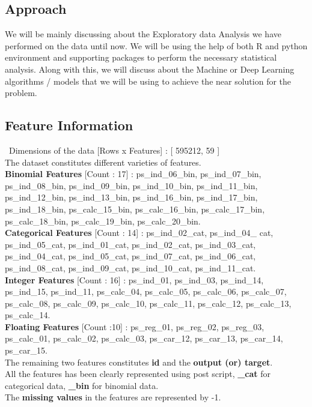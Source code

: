 \subsection{Approach}
We will be mainly discussing about the Exploratory data Analysis we have  performed on the data until now. We will be using the help of both R and python environment and supporting packages to perform the necessary statistical analysis. Along with this, we will discuss  about  the  Machine  or  Deep  Learning  algorithms  / models that we will be using to achieve the near solution for the problem.

\subsection{Feature Information}
\ Dimensions of the data [Rows x Features] : [ 595212, 59 ]
\\ \newline The dataset constitutes different varieties of features.
\\ \newline \textbf{Binomial Features} [Count : 17] :  ps\_ind\_06\_bin,  ps\_ind\_07\_bin, ps\_ind\_08\_bin, ps\_ind\_09\_bin, ps\_ind\_10\_bin, ps\_ind\_11\_bin, ps\_ind\_12\_bin, ps\_ind\_13\_bin, ps\_ind\_16\_bin, ps\_ind\_17\_bin, ps\_ind\_18\_bin, ps\_calc\_15\_bin, ps\_calc\_16\_bin, ps\_calc\_17\_bin, ps\_calc\_18\_bin, ps\_calc\_19\_bin, ps\_calc\_20\_bin.
\
\\ \newline \textbf{Categorical Features} [Count : 14] : ps\_ind\_02\_cat,  ps\_ind\_04\_ cat, ps\_ind\_05\_cat, ps\_ind\_01\_cat, ps\_ind\_02\_cat,  ps\_ind\_03\_cat, ps\_ind\_04\_cat, ps\_ind\_05\_cat, ps\_ind\_07\_cat,  ps\_ind\_06\_cat, ps\_ind\_08\_cat, ps\_ind\_09\_cat, ps\_ind\_10\_cat,  ps\_ind\_11\_cat.
\
\\ \newline \textbf{Integer Features} [Count : 16] : ps\_ind\_01, ps\_ind\_03, ps\_ind\_14, ps\_ind\_15, ps\_ind\_11, ps\_calc\_04, ps\_calc\_05, ps\_calc\_06, ps\_calc\_07, ps\_calc\_08, ps\_calc\_09, ps\_calc\_10, ps\_calc\_11, ps\_calc\_12, ps\_calc\_13, ps\_calc\_14.
\
\\ \newline \textbf{Floating Features} [Count :10] : ps\_reg\_01, ps\_reg\_02, ps\_reg\_03, ps\_calc\_01, ps\_calc\_02, ps\_calc\_03, ps\_car\_12, ps\_car\_13, ps\_car\_14, ps\_car\_15.
\\ \newline  The remaining two features constitutes \textbf{id} and the \textbf{output (or) target}. 
\\ \newline All the features has been clearly represented using post script, \textbf{\_cat} for categorical data, \textbf{\_bin} for binomial data.
\\ \newline The \textbf{missing values} in the features are represented by -1.

